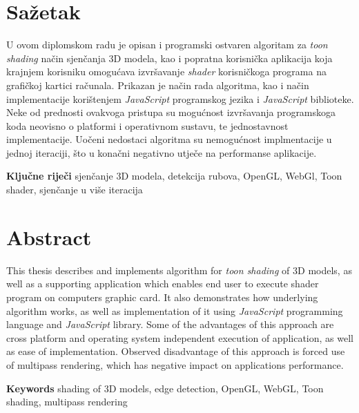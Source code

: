 \section*{Sažetak}

U ovom diplomskom radu je opisan i programski ostvaren algoritam za \emph{toon shading} način sjenčanja 3D modela, kao i popratna korisnička aplikacija koja krajnjem korisniku omogućava izvršavanje \emph{shader} korisničkoga programa na grafičkoj kartici računala. Prikazan je način rada algoritma, kao i način implementacije korištenjem \emph{JavaScript} programskog jezika i \emph{JavaScript} biblioteke. Neke od prednosti ovakvoga pristupa su mogućnost izvršavanja programskoga koda neovisno o platformi i operativnom sustavu, te jednostavnost implementacije. Uočeni nedostaci algoritma su nemogućnost implmentacije u jednoj iteraciji, što u konačni negativno utječe na performanse aplikacije.

\textbf{Ključne riječi} sjenčanje 3D modela, detekcija rubova, OpenGL, WebGl, Toon shader, sjenčanje u više iteracija

\section*{Abstract}

This thesis describes and implements algorithm for \emph{toon shading} of 3D models, as well as a supporting application which enables end user to execute shader program on computers graphic card.  It also demonstrates how underlying algorithm works, as well as implementation of it using \emph{JavaScript} programming language and \emph{JavaScript} library. Some of the advantages of this approach are cross platform and operating system independent execution of application, as well as ease of implementation. Observed disadvantage of this approach is forced use of multipass rendering, which has negative impact on applications performance.


\textbf{Keywords} shading of 3D models, edge detection, OpenGL, WebGL, Toon shading, multipass rendering